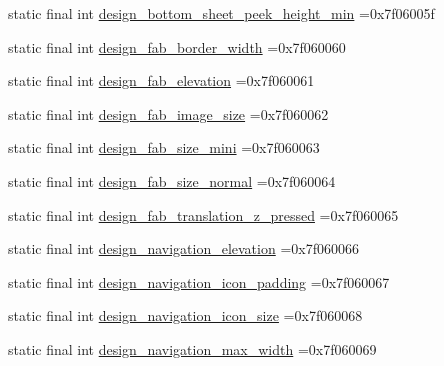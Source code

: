 \begin{DoxyCompactItemize}
\item 
static final int \mbox{\hyperlink{classcom_1_1example_1_1trainawearapplication_1_1_r_1_1dimen_a588305306bc9dcdc349b24703ef00d2b}{design\+\_\+bottom\+\_\+sheet\+\_\+peek\+\_\+height\+\_\+min}} =0x7f06005f
\item 
static final int \mbox{\hyperlink{classcom_1_1example_1_1trainawearapplication_1_1_r_1_1dimen_afbf38461c863fe7da40c057919eac073}{design\+\_\+fab\+\_\+border\+\_\+width}} =0x7f060060
\item 
static final int \mbox{\hyperlink{classcom_1_1example_1_1trainawearapplication_1_1_r_1_1dimen_a2ec6f526795752db30aa1ef98ca1262c}{design\+\_\+fab\+\_\+elevation}} =0x7f060061
\item 
static final int \mbox{\hyperlink{classcom_1_1example_1_1trainawearapplication_1_1_r_1_1dimen_a5cb34f03d666d1f4854851a666ad1c0e}{design\+\_\+fab\+\_\+image\+\_\+size}} =0x7f060062
\item 
static final int \mbox{\hyperlink{classcom_1_1example_1_1trainawearapplication_1_1_r_1_1dimen_a18a91fea2a431eb4b8cf383bcf722db7}{design\+\_\+fab\+\_\+size\+\_\+mini}} =0x7f060063
\item 
static final int \mbox{\hyperlink{classcom_1_1example_1_1trainawearapplication_1_1_r_1_1dimen_af75dd80116310521784e533dba0172b2}{design\+\_\+fab\+\_\+size\+\_\+normal}} =0x7f060064
\item 
static final int \mbox{\hyperlink{classcom_1_1example_1_1trainawearapplication_1_1_r_1_1dimen_ac3442bc216b576b33263063d75862aab}{design\+\_\+fab\+\_\+translation\+\_\+z\+\_\+pressed}} =0x7f060065
\item 
static final int \mbox{\hyperlink{classcom_1_1example_1_1trainawearapplication_1_1_r_1_1dimen_a4b3cd90d897597c295bce9972e2d4302}{design\+\_\+navigation\+\_\+elevation}} =0x7f060066
\item 
static final int \mbox{\hyperlink{classcom_1_1example_1_1trainawearapplication_1_1_r_1_1dimen_a97c631fcc37295e9d43d27c58a20ac51}{design\+\_\+navigation\+\_\+icon\+\_\+padding}} =0x7f060067
\item 
static final int \mbox{\hyperlink{classcom_1_1example_1_1trainawearapplication_1_1_r_1_1dimen_aaa2d531199500600baa71ce5d925d29f}{design\+\_\+navigation\+\_\+icon\+\_\+size}} =0x7f060068
\item 
static final int \mbox{\hyperlink{classcom_1_1example_1_1trainawearapplication_1_1_r_1_1dimen_a6ae9170fc9942350dab7860cd11a496a}{design\+\_\+navigation\+\_\+max\+\_\+width}} =0x7f060069
\item 

\end{DoxyCompactItemize}
